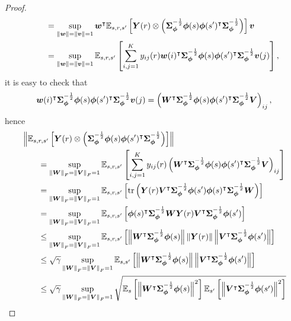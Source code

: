 \begin{proof}
\begin{equation*}
\begin{aligned}
        &\qquad =\sup_{\left\|{{\bm{w}}}\right\|=\left\|{{\bm{v}}}\right\|=1}{\bm{w}}^\intercal {\mathbb E}_{s, r, s^\prime}\left[{{\bm{Y}}(r)\otimes\left({{\bm{\Sigma}}_{{\bm{\phi}}}^{-\frac{1}{2}}{\bm{\phi}}(s){\bm{\phi}}(s^\prime)^{\intercal}{\bm{\Sigma}}_{{\bm{\phi}}}^{-\frac{1}{2}}}\right)}\right]{\bm{v}}\\
        &\qquad = \sup_{\left\|{{\bm{w}}}\right\|=\left\|{{\bm{v}}}\right\|=1}{\mathbb E}_{s, r, s^\prime}\left[{ \sum_{i,j=1}^K y_{ij}(r){\bm{w}}(i)^{\intercal}{\bm{\Sigma}}_{{\bm{\phi}}}^{-\frac{1}{2}}{\bm{\phi}}(s){\bm{\phi}}(s^\prime)^{\intercal}{\bm{\Sigma}}_{{\bm{\phi}}}^{-\frac{1}{2}} {\bm{v}}(j)   }\right],
\end{aligned}
\end{equation*}
it is easy to check that
\begin{equation*}
    {\bm{w}}(i)^{\intercal}{\bm{\Sigma}}_{{\bm{\phi}}}^{-\frac{1}{2}}{\bm{\phi}}(s){\bm{\phi}}(s^\prime)^{\intercal}{\bm{\Sigma}}_{{\bm{\phi}}}^{-\frac{1}{2}} {\bm{v}}(j) = \left({{\bm{W}}^{\intercal}{\bm{\Sigma}}_{{\bm{\phi}}}^{-\frac{1}{2}}{\bm{\phi}}(s){\bm{\phi}}(s^\prime)^{\intercal}{\bm{\Sigma}}_{{\bm{\phi}}}^{-\frac{1}{2}}{\bm{V}}}\right)_{ij},
\end{equation*}
hence
    \begin{equation*}
\begin{aligned}
        &\norm{\EB_{s, r, s^\prime}\brk{\bY(r)\otimes\prn{\bSigma_{\bphi}^{-\frac{1}{2}}\bphi(s)\bphi(s^\prime)^{\intercal}\bSigma_{\bphi}^{-\frac{1}{2}}}}}\\
        &\qquad = \sup_{\norm{\bW}_F=\norm{\bV}_F=1}\EB_{s, r, s^\prime}\brk{ \sum_{i,j=1}^K y_{ij}(r)\prn{\bW^{\intercal}\bSigma_{\bphi}^{-\frac{1}{2}}\bphi(s)\bphi(s^\prime)^{\intercal}\bSigma_{\bphi}^{-\frac{1}{2}}\bV}_{ij}  }\\
        &\qquad = \sup_{\norm{\bW}_F=\norm{\bV}_F=1}\EB_{s, r, s^\prime}\brk{ \tr\prn{ \bY(r)\bV^{\intercal}\bSigma_{\bphi}^{-\frac{1}{2}}\bphi(s^\prime)\bphi(s)^{\intercal}\bSigma_{\bphi}^{-\frac{1}{2}}\bW  }}\\
        &\qquad = \sup_{\norm{\bW}_F=\norm{\bV}_F=1}\EB_{s, r, s^\prime}\brk{\bphi(s)^{\intercal}\bSigma_{\bphi}^{-\frac{1}{2}}\bW   \bY(r)\bV^{\intercal}\bSigma_{\bphi}^{-\frac{1}{2}}\bphi(s^\prime) }\\
        &\qquad \leq \sup_{\norm{\bW}_F=\norm{\bV}_F=1}\EB_{s, r, s^\prime}\brk{\norm{\bW^{\intercal}\bSigma_{\bphi}^{-\frac{1}{2}}\bphi(s)}   \norm{\bY(r)}\norm{\bV^{\intercal}\bSigma_{\bphi}^{-\frac{1}{2}}\bphi(s^\prime)} }\\
        &\qquad \leq \sqrt\gamma\sup_{\norm{\bW}_F=\norm{\bV}_F=1}\EB_{s, s^\prime}\brk{\norm{\bW^{\intercal}\bSigma_{\bphi}^{-\frac{1}{2}}\bphi(s)}   \norm{\bV^{\intercal}\bSigma_{\bphi}^{-\frac{1}{2}}\bphi(s^\prime)} }\\
        &\qquad \leq \sqrt\gamma\sup_{\norm{\bW}_F=\norm{\bV}_F=1}\sqrt{\EB_{s }\brk{\norm{\bW^{\intercal}\bSigma_{\bphi}^{-\frac{1}{2}}\bphi(s)}^2 }  \EB_{ s^\prime}\brk{\norm{\bV^{\intercal}\bSigma_{\bphi}^{-\frac{1}{2}}\bphi(s^\prime)}^2 }}\\

\end{aligned}
\end{equation*}
\end{proof}
